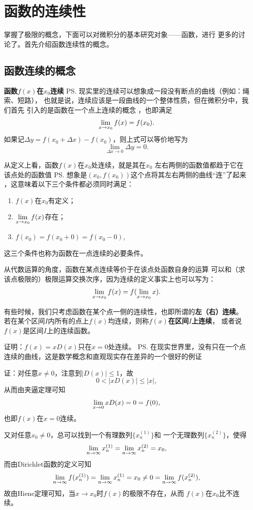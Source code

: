 \newpage
\section{函数的连续性}

掌握了极限的概念，下面可以对微积分的基本研究对象——函数，进行
更多的讨论了。首先介绍函数连续性的概念。

\subsection{函数连续的概念}

\begin{thx}
{\bf 函数$f(x)$在$x_0$连续}
\ps{现实里的连续可以想象成一段没有断点的曲线（例如：绳索、短路），
也就是说，连续应该是一段曲线的一个整体性质，但在微积分中，我们首先
引入的是函数在一个点上连续的概念}
，也即满足
	$$\lim\limits_{x\to{x_0}}f(x)=f(x_0).$$
	如果记$\Delta y=f(x_0+\Delta x)-f(x_0)$，则上式可以等价地写为
	$$\lim\limits_{\Delta x\to 0}\Delta y=0.$$
\end{thx}

从定义上看，函数$f(x)$在$x_0$处连续，就是其在$x_0$
左右两侧的函数值都趋于它在该点处的函数值
\ps{想象是$(x_0,f(x_0))$这个点将其左右两侧的曲线“连”了起来}
，这意味着以下三个条件都必须同时满足：
\begin{enumerate}[(1)]
	\setlength{\itemindent}{1cm}
	\item $f(x)$在$x_0$有定义； 
	\item $\lim\limits_{x\to{x_0}}f(x)$存在； 
	\item $f(x_0)=f(x_0+0)=f(x_0-0)$,
\end{enumerate}
这三个条件也称为函数在一点连续的必要条件。

\bs
从代数运算的角度，函数在某点连续等价于在该点处函数自身的运算
可以和（求该点极限的）极限运算交换次序，因为连续的定义事实上也可以写为：
$$\lim\limits_{x\to{x_0}}f(x)=f(\lim\limits_{x\to{x_0}}x).$$

\bs
有些时候，我们只考虑函数在某个点一侧的连续性，也即所谓的{\bf 左（右）连续}。
若在某个区间$I$内所有的点上$f(x)$均连续，则称{\bf $f(x)$在区间$I$上连续}，
或者说{$f(x)$是区间$I$上的连续函数}。

\bs
\egz 证明：$f(x)=xD(x)$只在$x=0$处连续。
\ps{在现实世界里，没有只在一个点连续的曲线，这是数学概念和直观现实存在差异的一个很好的例证}

证：对任意$x\ne 0$，注意到$|D(x)|\leq 1$，故
$$0<|xD(x)|\leq |x|,$$
从而由夹逼定理可知
$$\lim\limits_{x\to{0}}xD(x)=0=f(0),$$
也即$f(x)$在$x=0$连续。

又对任意$x_0\ne0$，总可以找到一个有理数列$\{x_n^{(1)}\}$和
一个无理数列$\{x_n^{(2)}\}$，使得
$$\lim\limits_{n\to\infty} x_n^{(1)}=\lim\limits_{n\to\infty} x_n^{(2)}=x_0,$$
而由Dirichlet函数的定义可知
$$\lim\limits_{n\to\infty} f(x_n^{(1)})=\lim\limits_{n\to\infty} x_n^{(1)}=x_0\ne 0=\lim\limits_{n\to\infty} f(x_n^{(2)}),$$
故由Hiene定理可知，当$x\to x_0$时$f(x)$的极限不存在，从而
$f(x)$在$x_0$比不连续。

